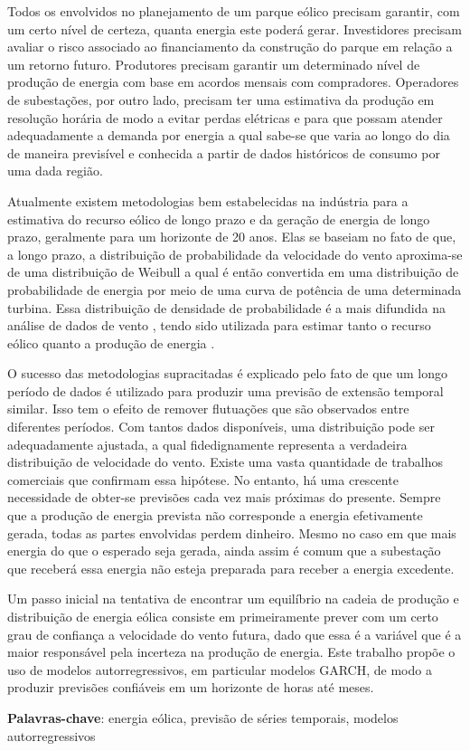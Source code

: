 \documentclass[
	12pt,				%
	openright,			%
	oneside,			%
	a4paper,			%
	english,			%
	french,				%
	spanish,			%
	brazil				%
	]{abntex2}
\begin{document}
\setlength{\absparsep}{18pt} %
\begin{resumo}
Todos os envolvidos no planejamento de um parque eólico precisam garantir, com um certo nível de certeza, quanta energia este poderá gerar. Investidores precisam avaliar o risco associado ao financiamento da construção do parque em relação a um retorno futuro. Produtores precisam garantir um determinado nível de produção de energia com base em acordos mensais com compradores. Operadores de subestações, por outro lado, precisam ter uma estimativa da produção em resolução horária de modo a evitar perdas elétricas e para que possam atender adequadamente a demanda por energia a qual sabe-se que varia ao longo do dia de maneira previsível e conhecida a partir de dados históricos de consumo por uma dada região.

Atualmente existem metodologias bem estabelecidas na indústria para a estimativa do recurso eólico de longo prazo e da geração de energia de longo prazo, geralmente para um horizonte de 20 anos. Elas se baseiam no fato de que, a longo prazo, a distribuição de probabilidade da velocidade do vento aproxima-se de uma distribuição de Weibull \cite{weibull} a qual é então convertida em uma distribuição de probabilidade de energia por meio de uma curva de potência de uma determinada turbina. Essa distribuição de densidade de probabilidade é a mais difundida na análise de dados de vento \cite{art13},  tendo sido utilizada para estimar tanto o recurso eólico \cite{art14} quanto a produção de energia \cite{art15}.

O sucesso das metodologias supracitadas é explicado pelo fato de que um longo período de dados é utilizado para produzir uma previsão de extensão temporal similar. Isso tem o efeito de remover flutuações que são observados entre diferentes períodos. Com tantos dados disponíveis, uma distribuição pode ser adequadamente ajustada, a qual fidedignamente representa a verdadeira distribuição de velocidade do vento. Existe uma vasta quantidade de trabalhos comerciais que confirmam essa hipótese. No entanto, há uma crescente necessidade de obter-se previsões cada vez mais próximas do presente. Sempre que a produção de energia prevista não corresponde a energia efetivamente gerada, todas as partes envolvidas perdem dinheiro. Mesmo no caso em que mais energia do que o esperado seja gerada, ainda assim é comum que a subestação que receberá essa energia não esteja preparada para receber a energia excedente.


Um passo inicial na tentativa de encontrar um equilíbrio na cadeia de produção e distribuição de energia eólica consiste em primeiramente prever com um certo grau de confiança a velocidade do vento futura, dado que essa é a variável que é a maior responsável pela incerteza na produção de energia. Este trabalho propõe o uso de modelos autorregressivos, em particular modelos GARCH, de modo a produzir previsões confiáveis em um horizonte de horas até meses.

 \textbf{Palavras-chave}: energia eólica, previsão de séries temporais, modelos autorregressivos
\end{resumo}
\end{document}
